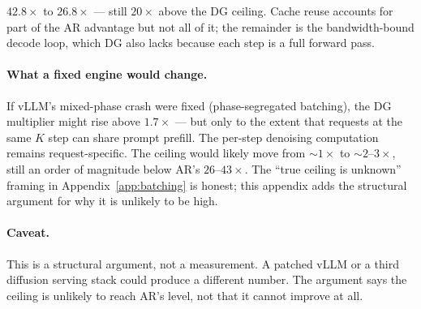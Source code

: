 $42.8\times$ to $26.8\times$ --- still $20\times$ above the DG ceiling.
Cache reuse accounts for part of the AR advantage but not all of it; the
remainder is the bandwidth-bound decode loop, which DG also lacks because
each step is a full forward pass. \paragraph{What a fixed engine would change.}
If vLLM's mixed-phase crash were fixed (phase-segregated batching), the
DG multiplier might rise above $1.7\times$ --- but only to the extent that
requests at the same $K$ step can share prompt prefill. The per-step
denoising computation remains request-specific. The ceiling would likely
move from $\sim 1\times$ to $\sim 2$--$3\times$, still an order of
magnitude below AR's $26$--$43\times$. The ``true ceiling is unknown''
framing in Appendix~\ref{app:batching} is honest; this appendix adds the
structural argument for why it is unlikely to be high. \paragraph{Caveat.}
This is a structural argument, not a measurement. A patched vLLM or a
third diffusion serving stack could produce a different number. The
argument says the ceiling is unlikely to reach AR's level, not that it
cannot improve at all.
